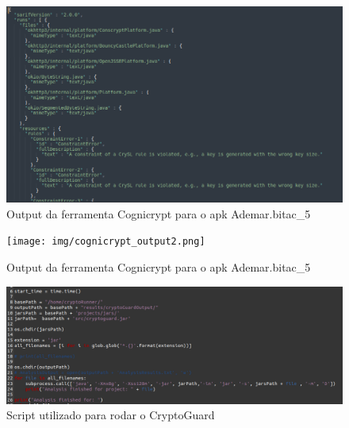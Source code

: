 \FloatBarrier

\begin{figure}[!ht]
  \centering
  \includegraphics[scale=0.5]{img/cognicrypt_output.png}
  \caption{Output da ferramenta Cognicrypt para o apk Ademar.bitac\_5}
  \label{img: cognicrypt_output}
\end{figure}

\FloatBarrier

\begin{figure}[!ht]
  \centering
  \texttt{[image: img/cognicrypt\_output2.png]}
  \caption{Output da ferramenta Cognicrypt para o apk Ademar.bitac\_5}
  \label{img: cognicrypt_output2}
\end{figure}

\FloatBarrier

\begin{figure}[!ht]
  \centering
  \includegraphics[scale=0.4]{img/cryptoguard_script.png}
  \caption{Script utilizado para rodar o CryptoGuard}
  \label{img: cryptoguard_script}
\end{figure}

\FloatBarrier

